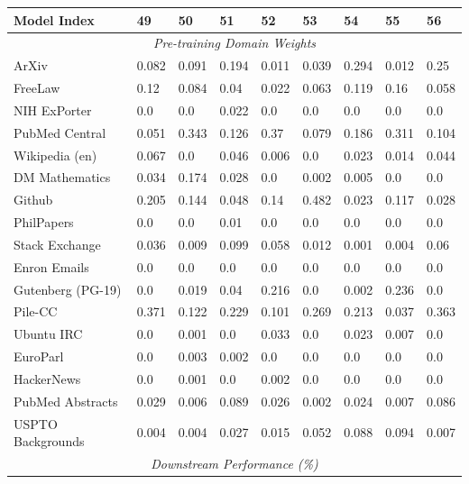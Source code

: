 \documentclass{article}
\theoremstyle{definition}
\theoremstyle{remark}
\begin{document}
\begin{table}[!ht]
    \centering
    \begin{tabular}{lllllllll}
    \toprule
        \textbf{Model Index} & \textbf{49} & \textbf{50} & \textbf{51} & \textbf{52} & \textbf{53} & \textbf{54} & \textbf{55} & \textbf{56} \\ \midrule
        \multicolumn{9}{c}{\textit{Pre-training Domain Weights}} \\
        ArXiv & 0.082 & 0.091 & 0.194 & 0.011 & 0.039 & 0.294 & 0.012 & 0.25 \\ 
        FreeLaw & 0.12 & 0.084 & 0.04 & 0.022 & 0.063 & 0.119 & 0.16 & 0.058 \\ 
        NIH ExPorter & 0.0 & 0.0 & 0.022 & 0.0 & 0.0 & 0.0 & 0.0 & 0.0 \\ 
        PubMed Central & 0.051 & 0.343 & 0.126 & 0.37 & 0.079 & 0.186 & 0.311 & 0.104 \\ 
        Wikipedia (en) & 0.067 & 0.0 & 0.046 & 0.006 & 0.0 & 0.023 & 0.014 & 0.044 \\ 
        DM Mathematics & 0.034 & 0.174 & 0.028 & 0.0 & 0.002 & 0.005 & 0.0 & 0.0 \\ 
        Github & 0.205 & 0.144 & 0.048 & 0.14 & 0.482 & 0.023 & 0.117 & 0.028 \\ 
        PhilPapers & 0.0 & 0.0 & 0.01 & 0.0 & 0.0 & 0.0 & 0.0 & 0.0 \\ 
        Stack Exchange & 0.036 & 0.009 & 0.099 & 0.058 & 0.012 & 0.001 & 0.004 & 0.06 \\ 
        Enron Emails & 0.0 & 0.0 & 0.0 & 0.0 & 0.0 & 0.0 & 0.0 & 0.0 \\ 
        Gutenberg (PG-19) & 0.0 & 0.019 & 0.04 & 0.216 & 0.0 & 0.002 & 0.236 & 0.0 \\ 
        Pile-CC & 0.371 & 0.122 & 0.229 & 0.101 & 0.269 & 0.213 & 0.037 & 0.363 \\ 
        Ubuntu IRC & 0.0 & 0.001 & 0.0 & 0.033 & 0.0 & 0.023 & 0.007 & 0.0 \\ 
        EuroParl & 0.0 & 0.003 & 0.002 & 0.0 & 0.0 & 0.0 & 0.0 & 0.0 \\ 
        HackerNews & 0.0 & 0.001 & 0.0 & 0.002 & 0.0 & 0.0 & 0.0 & 0.0 \\ 
        PubMed Abstracts & 0.029 & 0.006 & 0.089 & 0.026 & 0.002 & 0.024 & 0.007 & 0.086 \\ 
        USPTO Backgrounds & 0.004 & 0.004 & 0.027 & 0.015 & 0.052 & 0.088 & 0.094 & 0.007 \\ 
        \midrule
        \multicolumn{9}{c}{\textit{Downstream Performance (\%)}} \\

\end{tabular}
\end{table}
\end{document}

